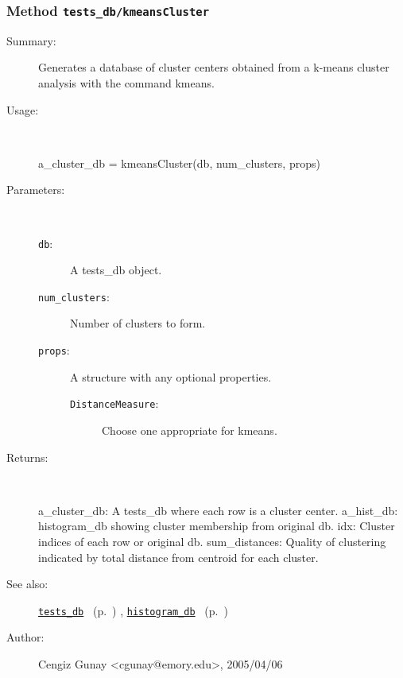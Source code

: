 \subsubsection[Method \texttt{kmeansCluster}]{Method \texttt{tests\_db/kmeansCluster}}%
%
\label{ref_tests_db__kmeansCluster}%
\hypertarget{ref_tests_db__kmeansCluster}{}%
\begin{description}
\item[Summary:]Generates a database of cluster centers obtained from a k-means cluster analysis with the command kmeans.
%
\item[Usage:]~%
\begin{lyxcode}%
a\_cluster\_db = kmeansCluster(db, num\_clusters, props)
%
\end{lyxcode}%
%
%
\item[Parameters:]~
\begin{description}%
\item[\texttt{db}:]
 A tests\_db object.
\item[\texttt{num\_clusters}:]
 Number of clusters to form.
\item[\texttt{props}:]
 A structure with any optional properties.
\begin{description}%
\item[\texttt{DistanceMeasure}:]
 Choose one appropriate for kmeans.
\end{description}%
\end{description}%
%
\item[Returns:]~

	a\_cluster\_db: A tests\_db where each row is a cluster center.
	a\_hist\_db: histogram\_db showing cluster membership from original db.
	idx: Cluster indices of each row or original db.
	sum\_distances: Quality of clustering indicated by total distance from
			centroid for each cluster.
%
%
\item[See also:]%
\hyperlink{ref_tests_db}{\texttt{tests\_db}}%
\ (p.~\pageref{ref_tests_db})%
%
, \hyperlink{ref_histogram_db}{\texttt{histogram\_db}}%
\ (p.~\pageref{ref_histogram_db})%
%
%
\item[Author:]%
Cengiz Gunay <cgunay@emory.edu>, 2005/04/06%
\end{description}
\methodline%
